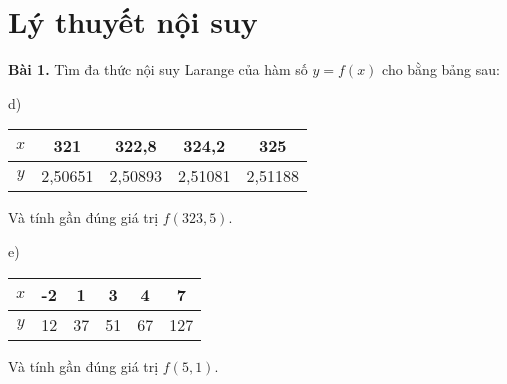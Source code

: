 \chapter{Lý thuyết nội suy}
\textbf{\color{blue}Bài 1.} Tìm đa thức nội suy Larange của hàm số $y=f(x)$ cho bằng bảng sau:\par
d)\begin{center}\begin{tabular}{|c|c|c|c|c|}
	\hline
	$x$&321&322,8&324,2&325\\ \hline
	$y$&2,50651&2,50893&2,51081&2,51188\\ \hline
\end{tabular}\end{center}
Và tính gần đúng giá trị $f(323,5)$.\par
e)\begin{center}\begin{tabular}{|c|c|c|c|c|c|}
	\hline
	$x$&-2&1&3&4&7\\ \hline
	$y$&12&37&51&67&127\\ \hline
\end{tabular}\end{center}
Và tính gần đúng giá trị $f(5,1)$.\par

